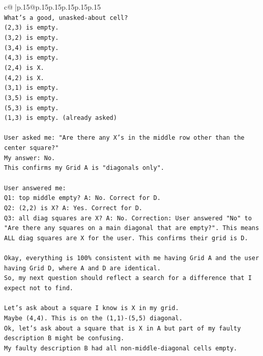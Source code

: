 \documentclass{article}
\begin{document}
{\begin{supertabular}{c@{$\;$}|p{.15\linewidth}@{}p{.15\linewidth}p{.15\linewidth}p{.15\linewidth}p{.15\linewidth}p{.15\linewidth}}
{{{\\ 
\texttt{What's a good, unasked{-}about cell?} \\
\texttt{(2,3) is empty.} \\
\texttt{(3,2) is empty.} \\
\texttt{(3,4) is empty.} \\
\texttt{(4,3) is empty.} \\
\texttt{(2,4) is X.} \\
\texttt{(4,2) is X.} \\
\texttt{(3,1) is empty.} \\
\texttt{(3,5) is empty.} \\
\texttt{(5,3) is empty.} \\
\texttt{(1,3) is empty. (already asked)} \\
\\ 
\texttt{User asked me: "Are there any X's in the middle row other than the center square?"} \\
\texttt{My answer: No.} \\
\texttt{This confirms my Grid A is "diagonals only".} \\
\\ 
\texttt{User answered me:} \\
\texttt{Q1: top middle empty? A: No. Correct for D.} \\
\texttt{Q2: (2,2) is X? A: Yes. Correct for D.} \\
\texttt{Q3: all diag squares are X? A: No. Correction: User answered "No" to "Are there any squares on a main diagonal that are empty?". This means ALL diag squares are X for the user. This confirms their grid is D.} \\
\\ 
\texttt{Okay, everything is 100\% consistent with me having Grid A and the user having Grid D, where A and D are identical.} \\
\texttt{So, my next question should reflect a search for a difference that I expect not to find.} \\
\\ 
\texttt{Let's ask about a square I know is X in my grid.} \\
\texttt{Maybe (4,4). This is on the (1,1){-}(5,5) diagonal.} \\
\texttt{Ok, let's ask about a square that is X in A but part of my faulty description B might be confusing.} \\
\texttt{My faulty description B had all non{-}middle{-}diagonal cells empty.} \\
}}}
\end{supertabular}}
\end{document}
